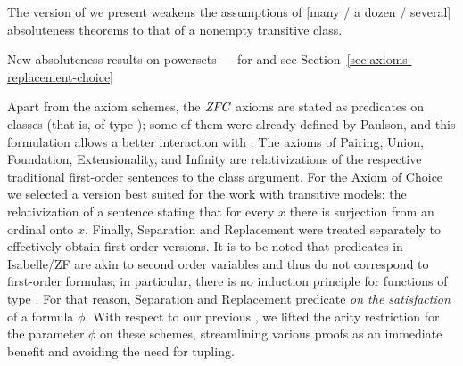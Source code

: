 The version of  we present weakens the
assumptions of [many / a dozen / several] absoluteness theorems to that
of a nonempty transitive class.
%
\begin{framed}
  New absoluteness results on powersets --- for  and
   see Section~\ref{sec:axioms-replacement-choice}
\end{framed}

Apart from the axiom schemes, the $\mathit{ZFC}$ 
axioms are stated as predicates on classes (that is,
of type ); some
of them were already defined by Paulson, and this formulation allows a
better interaction with . 
The axioms of Pairing, Union, Foundation,
Extensionality, and Infinity are relativizations of the respective
traditional 
first-order sentences to the class argument. For the Axiom of Choice
we selected a version best suited for the work with transitive
models: the relativization of a sentence stating that for every $x$
there is surjection from an ordinal onto $x$. Finally, Separation and
Replacement were treated separately to effectively obtain first-order
versions. It is to be noted that predicates in Isabelle/ZF are akin to
second order variables and thus do not correspond to first-order
formulas; in particular, there is no induction principle for functions
of type . For that reason, Separation and
Replacement predicate \emph{on the satisfaction} of a formula $\phi$.
With respect to our previous \cite{2019arXiv190103313G}, we lifted the
arity restriction for the parameter $\phi$ on these schemes,
streamlining various proofs as an immediate benefit and avoiding the
need for tupling.


